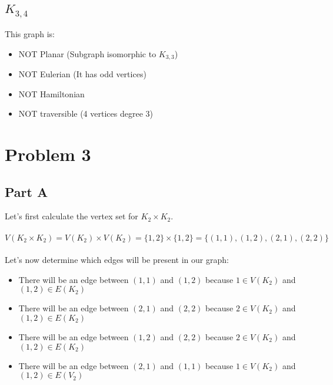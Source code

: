 \documentclass{article}%
\begin{document}
\subsection{$K_{3, 4}$}


This graph is:
\begin{itemize}
    \item NOT Planar (Subgraph isomorphic to $K_{3,3}$)
    \item NOT Eulerian (It has odd vertices)
    \item NOT Hamiltonian
    \item NOT traversible (4 vertices degree 3)
\end{itemize}

\section{Problem 3}

\subsection{Part A}

Let's first calculate the vertex set for $K_2 \times K_2$.\\ \\
$V(K_2 \times K_2) = V(K_2) \times V(K_2) = \{1, 2\} \times \{1, 2\} = \{(1, 1), (1, 2), (2, 1), (2, 2)\}$ \\ \\
Let's now determine which edges will be present in our graph:
\begin{itemize}
    \item There will be an edge between $(1, 1)$ and $(1, 2)$ because $1 \in V(K_2)$ and $(1,2) \in E(K_2)$
    \item There will be an edge between $(2, 1)$ and $(2, 2)$ because $2 \in V(K_2)$ and $(1,2) \in E(K_2)$
    \item There will be an edge between $(1, 2)$ and $(2, 2)$ because $2 \in V(K_2)$ and $(1,2) \in E(K_2)$
    \item There will be an edge between $(2, 1)$ and $(1, 1)$ because $1 \in V(K_2)$ and $(1,2) \in E(V_2)$
\end{itemize}
\end{document}
